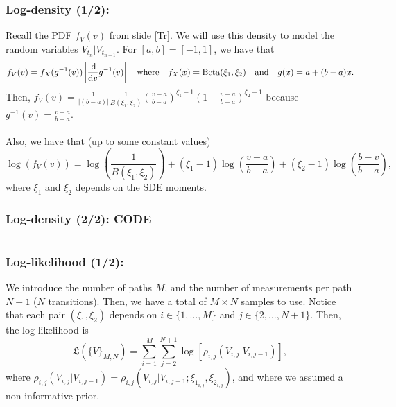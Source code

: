 \documentclass[aspectratio=169]{beamer}\usepackage[utf8]{inputenc}
\begin{document}
\begin{frame}\frametitle{Log-density (1/2):}

Recall the PDF $f_V(v)$ from slide {\color{blue}\ref{Tr}}. We will use this density to model the random variables $V_{t_n}|V_{t_{n-1}}$. For $[a,b]=[-1,1]$, we have that
\begin{equation*}
f_V(v)=f_X(g^{-1}(v))\left|\frac{\dif}{\dif v}g^{-1}(v)\right|\quad \text{where}\quad f_X(x)=\text{Beta}(\xi_1,\xi_2)\quad\text{and}\quad g(x)=a+(b-a)x.
\end{equation*}
Then, $f_V(v)=\frac{1}{|(b-a)|}\frac{1}{B(\xi_1,\xi_2)}\left(\frac{v-a}{b-a}\right)^{\xi_1-1}\left(1-\frac{v-a}{b-a}\right)^{\xi_2-1}$ because $g^{-1}(v)=\frac{v-a}{b-a}$.\\
\quad\\
Also, we have that (up to some constant values)
\begin{equation*}
\log\left(f_V(v)\right)=\log\left(\frac{1}{B(\xi_1,\xi_2)}\right)+(\xi_1-1)\log\left(\frac{v-a}{b-a}\right)+(\xi_2-1)\log\left(\frac{b-v}{b-a}\right),
\end{equation*}
where $\xi_1$ and $\xi_2$ depends on the SDE moments.

\end{frame}


\begin{frame}\frametitle{Log-density (2/2): CODE}

\begin{center}
\begin{tabular}{|c|}
\toprule
{\footnotesize

}\\
\bottomrule
\end{tabular}
\end{center}

\end{frame}


\begin{frame}\frametitle{Log-likelihood (1/2):}

We introduce the number of paths $M$, and the number of measurements per path $N+1$ ($N$ transitions). Then, we have a total of $M\times N$ samples to use. Notice that each pair $(\xi_1,\xi_2)$ depends on $i\in\{1,\dots,M\}$ and $j\in\{2,\dots,N+1\}$. Then, the log-likelihood is
\begin{equation*}
\mathfrak{L}\left(\{V\}_{M,N}\right)=\sum_{i=1}^M\sum_{j=2}^{N+1}\log\left[\rho_{i,j}\left(V_{i,j}|V_{i,j-1}\right)\right],
\end{equation*}
where $\rho_{i,j}\left(V_{i,j}|V_{i,j-1}\right)=\rho_{i,j}\left(V_{i,j}|V_{i,j-1};\xi_{1_{i,j}},\xi_{2_{i,j}}\right)$, and where we assumed a non-informative prior.

\end{frame}
\end{document}
